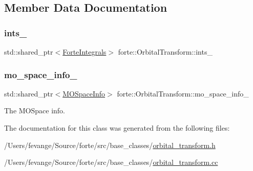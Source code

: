\subsection{Member Data Documentation}
\mbox{\label{classforte_1_1_orbital_transform_ac8ec571c856508d57f8a96f68e8eaffb}} 
\subsubsection{\texorpdfstring{ints\+\_\+}{ints\_}}
{\footnotesize\ttfamily std\+::shared\+\_\+ptr$<$\mbox{\hyperlink{classforte_1_1_forte_integrals}{Forte\+Integrals}}$>$ forte\+::\+Orbital\+Transform\+::ints\+\_\+}

\mbox{\label{classforte_1_1_orbital_transform_ae1f7c618a926c324f20d67946ebec695}} 
\subsubsection{\texorpdfstring{mo\+\_\+space\+\_\+info\+\_\+}{mo\_space\_info\_}}
{\footnotesize\ttfamily std\+::shared\+\_\+ptr$<$\mbox{\hyperlink{classforte_1_1_m_o_space_info}{M\+O\+Space\+Info}}$>$ forte\+::\+Orbital\+Transform\+::mo\+\_\+space\+\_\+info\+\_\+}



The M\+O\+Space info. 



The documentation for this class was generated from the following files\+:\begin{DoxyCompactItemize}
\item 
/\+Users/fevange/\+Source/forte/src/base\+\_\+classes/\mbox{\hyperlink{orbital__transform_8h}{orbital\+\_\+transform.\+h}}\item 
/\+Users/fevange/\+Source/forte/src/base\+\_\+classes/\mbox{\hyperlink{orbital__transform_8cc}{orbital\+\_\+transform.\+cc}}\end{DoxyCompactItemize}
